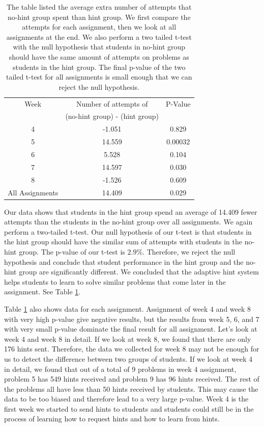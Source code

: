 \documentclass{llncs}
\begin{document}
\begin{table}
\caption{The table listed the average extra number of attempts that no-hint group spent than hint group. We first compare the attempts for each assignment, then we look at all assignments at the end. We also perform a two tailed t-test with the null hypothesis that students in no-hint group should have the same amount of attempts on problems as students in the hint group. The final p-value of the two tailed t-test for all assignments is small enough that we can reject the null hypothesis.}

\begin{center}
  \begin{tabular}{| c | c | c |}
  \hline
   Week & Number of attempts of & P-Value \\
      & (no-hint group) - (hint group)  & \\ \hline
	4 & -1.051 & 0.829 \\
	5 & 14.559 & 0.00032 \\
	6 & 5.528 & 0.104 \\
	7 & 14.597 & 0.030 \\
	8 & -1.526 & 0.609 \\ \hline
    All Assignments & 14.409 & 0.029 \\ 
    \hline
  \end{tabular}
  \label{tab:no_hint}
  \end{center}
\end{table}

Our data shows that students in the hint group spend an average of 14.409 fewer attempts than the students in the no-hint group over all assignments. We again perform a two-tailed t-test. Our null hypothesis of our t-test is that students in the hint group should have the similar sum of attempts with students in the no-hint group. The p-value of our t-test is $2.9\%$. Therefore, we reject the null hypothesis and conclude that student performance in the hint group and the no-hint group are significantly different. We concluded that the adaptive hint system helps students to learn to solve similar problems that come later in the assignment. See Table \ref{tab:no_hint}.

Table \ref{tab:no_hint} also shows data for each assignment. Assignment of week 4 and week 8 with very high p-value give negative results, but the results from week 5, 6, and 7 with very small p-value dominate the final result for all assignment. Let's look at week 4 and week 8 in detail. If we look at week 8, we found that there are only 176 hints sent. Therefore, the data we collected for week 8 may not be enough for us to detect the difference between two groups of students. If we look at week 4 in detail, we found that out of a total of 9 problems in week 4 assignment, problem 5 has 549 hints received and problem 9 has 96 hints received. The rest of the problems all have less than 50 hints received by students. This may cause the data to be too biased and therefore lead to a very large p-value. Week 4 is the first week we started to send hints to students and students could still be in the process of learning how to request hints and how to learn from hints.
\end{document}
